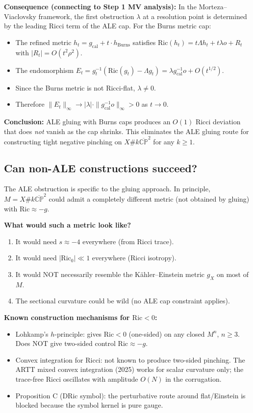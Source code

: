 \textbf{Consequence (connecting to Step 1 MV analysis):}
In the Morteza--Viaclovsky framework, the first obstruction $\lambda$ at a resolution point
is determined by the leading Ricci term of the ALE cap. For the Burns metric cap:
\begin{itemize}
\item The refined metric $h_t = g_{\mathrm{cal}} + t\cdot h_{\mathrm{Burns}}$ satisfies
      $\mathrm{Ric}(h_t) = t\Lambda h_t + t\lambda o + R_t$ with $|R_t| = O(t^2 \rho^2)$.
\item The endomorphism $E_t = g_t^{-1}(\mathrm{Ric}(g_t) - \Lambda g_t) = \lambda g_{\mathrm{cal}}^{-1}o + O(t^{1/2})$.
\item Since the Burns metric is not Ricci-flat, $\lambda \neq 0$.
\item Therefore $\|E_t\|_\infty \to |\lambda| \cdot \|g_{\mathrm{cal}}^{-1}o\|_\infty > 0$ as $t \to 0$.
\end{itemize}

\textbf{Conclusion:} ALE gluing with Burns caps produces an $O(1)$ Ricci deviation that
does \emph{not} vanish as the cap shrinks. This eliminates the ALE gluing route for
constructing tight negative pinching on $X \# k\overline{\mathbb{CP}}^2$ for any $k \geq 1$.

\subsection{Can non-ALE constructions succeed?}

The ALE obstruction is specific to the gluing approach. In principle, $M = X \# k\overline{\mathbb{CP}}^2$
could admit a completely different metric (not obtained by gluing) with $\mathrm{Ric} \approx -g$.

\textbf{What would such a metric look like?}
\begin{enumerate}
\item It would need $s \approx -4$ everywhere (from Ricci trace).
\item It would need $|\mathrm{Ric}_0| \ll 1$ everywhere (Ricci isotropy).
\item It would NOT necessarily resemble the Kähler--Einstein metric $g_X$ on most of $M$.
\item The sectional curvature could be wild (no ALE cap constraint applies).
\end{enumerate}

\textbf{Known construction mechanisms for $\mathrm{Ric} < 0$:}
\begin{itemize}
\item Lohkamp's $h$-principle: gives $\mathrm{Ric} < 0$ (one-sided) on any closed $M^n$, $n \geq 3$.
      Does NOT give two-sided control $\mathrm{Ric} \approx -g$.
\item Convex integration for Ricci: not known to produce two-sided pinching.
      The ARTT mixed convex integration (2025) works for scalar curvature only; the
      trace-free Ricci oscillates with amplitude $O(N)$ in the corrugation.
\item Proposition C (DRic symbol): the perturbative route around flat/Einstein is
      blocked because the symbol kernel is pure gauge.
\end{itemize}

